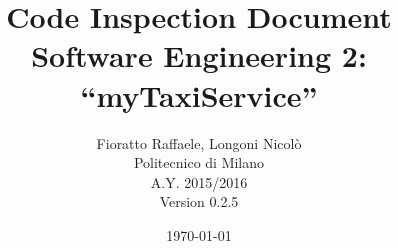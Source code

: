 \begin{figure}
  \centering
	\def\svgwidth{\columnwidth}
    \resizebox{0.66\textwidth}{!}{}
\end{figure}
\title{{\Huge \textbf{C}ode \textbf{I}nspection \textbf{D}ocument}\\{\Large Software Engineering 2: ``myTaxiService''}}

\author{Fioratto Raffaele, Longoni Nicol\`{o}
\\Politecnico di Milano
\\{\small A.Y. 2015/2016}
\\{\small Version 0.2.5}}
\date{\today}
\maketitle
\newpage
\tableofcontents
\listoffigures